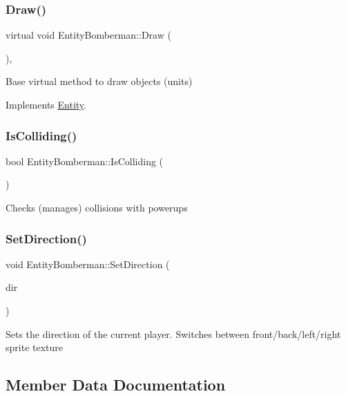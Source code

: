 \subsubsection{\texorpdfstring{Draw()}{Draw()}}
{\footnotesize\ttfamily virtual void Entity\+Bomberman\+::\+Draw (\begin{DoxyParamCaption}{ }\end{DoxyParamCaption})\hspace{0.3cm}{\ttfamily [override]}, {\ttfamily [virtual]}}

Base virtual method to draw objects (units) 

Implements \mbox{\hyperlink{class_entity_a1d006ae3028ba4ddfc9b4f202ccddf55}{Entity}}.

\mbox{\label{class_entity_bomberman_a34a0f17c5aab2afcf56a7ea84190193f}} 
\subsubsection{\texorpdfstring{IsColliding()}{IsColliding()}}
{\footnotesize\ttfamily bool Entity\+Bomberman\+::\+Is\+Colliding (\begin{DoxyParamCaption}{ }\end{DoxyParamCaption})}

Checks (manages) collisions with powerups \mbox{\label{class_entity_bomberman_ad9997de80c14794d3b442e7e6d773893}} 
\subsubsection{\texorpdfstring{SetDirection()}{SetDirection()}}
{\footnotesize\ttfamily void Entity\+Bomberman\+::\+Set\+Direction (\begin{DoxyParamCaption}\item[{Player\+Dir}]{dir }\end{DoxyParamCaption})}

Sets the direction of the current player. Switches between front/back/left/right sprite texture 

\subsection{Member Data Documentation}
\mbox{\label{class_entity_bomberman_a47768720c9807e7edd7a71f4cc536e7b}} 

